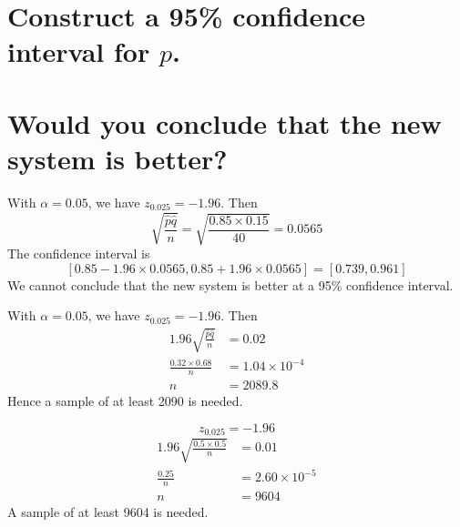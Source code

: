 \documentclass[answers]{exam}
\begin{document}
\begin{questions}
\begin{parts}
    \part{Construct a 95\% confidence interval for $p$.}
    \part{Would you conclude that the new system is better?}
\end{parts}

\begin{solution}
    With $\alpha = 0.05$, we have $z_{0.025} = -1.96$. Then
    $$\sqrt{\frac{\hat p\hat q}{n}} = \sqrt{\frac{0.85\times0.15}{40}} = 0.0565$$
    The confidence interval is
    $$[0.85 - 1.96\times0.0565, 0.85 + 1.96\times0.0565] = [0.739, 0.961]$$
    We cannot conclude that the new system is better at a 95\% confidence interval.
\end{solution}


\begin{solution}
    With $\alpha = 0.05$, we have $z_{0.025} = -1.96$. Then
    \begin{align*}
       1.96\sqrt{\frac{\hat p\hat q}{n}} &= 0.02 \\
        \frac{0.32\times0.68}{n} &= 1.04\times10^{-4} \\
        n &= 2089.8
    \end{align*}
    Hence a sample of at least 2090 is needed.
\end{solution}


\begin{solution}
    $$z_{0.025} = -1.96$$
    \begin{align*}
        1.96\sqrt{\frac{0.5\times0.5}{n}} &= 0.01 \\
        \frac{0.25}{n} &= 2.60\times10^{-5} \\
        n &= 9604
    \end{align*}
    A sample of at least 9604 is needed.
\end{solution}

\end{questions}
\end{document}
